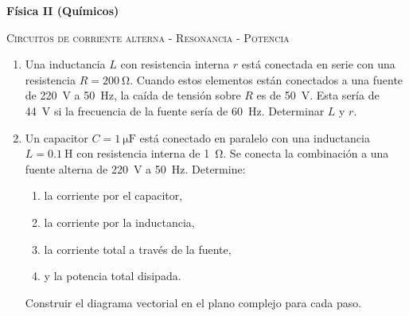 \documentclass[11pt,spanish,a4paper]{article}
\begin{document}
\noindent
\textbf{Física II (Químicos)}\hfill {}
\begin{center}
  \textsc{\large Circuitos de corriente alterna - Resonancia - Potencia}
\par\end{center}{\large \par}


\begin{enumerate}

	\item Una inductancia \(L\) con resistencia interna \(r\) está conectada en serie con una resistencia \(R= \SI{200}{\ohm}\).
		Cuando estos elementos están conectados a una fuente de \SI{220}{\volt} a \SI{50}{\hertz}, la caída de tensión sobre \(R\) es de \SI{50}{\volt}.
		Esta sería de \SI{44}{\volt} si la frecuencia de la fuente sería de \SI{60}{\hertz}.
	Determinar \(L\) y \(r\).


	\item Un capacitor \(C= \SI{1}{\micro\farad}\) está conectado en paralelo con una inductancia \(L= \SI{0.1}{\henry}\) con resistencia interna de \SI{1}{\ohm}.
		Se conecta la combinación a una fuente alterna de \SI{220}{\volt} a \SI{50}{\hertz}.
		Determine:
		\begin{enumerate}
			\item la corriente por el capacitor,
			\item la corriente por la inductancia,
			\item la corriente total a través de la fuente,
			\item y la potencia total disipada.
		\end{enumerate}
		Construir el diagrama vectorial en el plano complejo para cada paso.



\end{enumerate}
\end{document}
